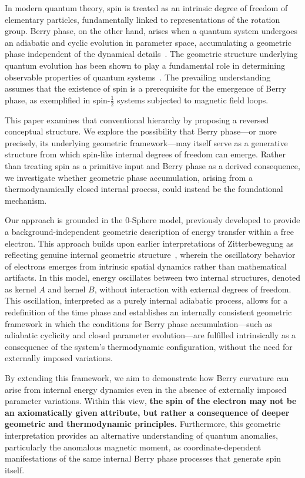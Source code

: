 \documentclass[%
 reprint,
 amsmath,amssymb,
 aps,
]{revtex4-1}
\numberwithin{equation}{section}%
\begin{document}
In modern quantum theory, spin is treated as an intrinsic degree of freedom of elementary particles, fundamentally linked to representations of the rotation group. Berry phase, on the other hand, arises when a quantum system undergoes an adiabatic and cyclic evolution in parameter space, accumulating a geometric phase independent of the dynamical details~\cite{shapere1989geometric}. The geometric structure underlying quantum evolution has been shown to play a fundamental role in determining observable properties of quantum systems~\cite{anandan1992geometric}. The prevailing understanding assumes that the existence of spin is a prerequisite for the emergence of Berry phase, as exemplified in spin-$\frac{1}{2}$ systems subjected to magnetic field loops.

This paper examines that conventional hierarchy by proposing a reversed conceptual structure. We explore the possibility that Berry phase—or more precisely, its underlying geometric framework—may itself serve as a generative structure from which spin-like internal degrees of freedom can emerge. Rather than treating spin as a primitive input and Berry phase as a derived consequence, we investigate whether geometric phase accumulation, arising from a thermodynamically closed internal process, could instead be the foundational mechanism.

Our approach is grounded in the 0-Sphere model, previously developed to provide a background-independent geometric description of energy transfer within a free electron. This approach builds upon earlier interpretations of Zitterbewegung as reflecting genuine internal geometric structure~\cite{barut1981zitterbewegung}, wherein the oscillatory behavior of electrons emerges from intrinsic spatial dynamics rather than mathematical artifacts. In this model, energy oscillates between two internal structures, denoted as kernel $A$ and kernel $B$, without interaction with external degrees of freedom. This oscillation, interpreted as a purely internal adiabatic process, allows for a redefinition of the time phase and establishes an internally consistent geometric framework in which the conditions for Berry phase accumulation—such as adiabatic cyclicity and closed parameter evolution—are fulfilled intrinsically as a consequence of the system’s thermodynamic configuration, without the need for externally imposed variations.

By extending this framework, we aim to demonstrate how Berry curvature can arise from internal energy dynamics even in the absence of externally imposed parameter variations. Within this view, \textbf{the spin of the electron may not be an axiomatically given attribute, but rather a consequence of deeper geometric and thermodynamic principles.} Furthermore, this geometric interpretation provides an alternative understanding of quantum anomalies, particularly the anomalous magnetic moment, as coordinate-dependent manifestations of the same internal Berry phase processes that generate spin itself.
\end{document}
